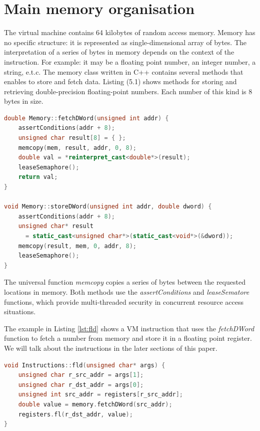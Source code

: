 \documentclass[oneside]{book}
\begin{document}
\section{Main memory organisation}

The virtual machine contains 64 kilobytes of random access memory. Memory has no specific structure: it is represented as single-dimensional array of bytes. The interpretation of a series of bytes in memory depends on the context of the instruction. For example: it may be a floating point number, an integer number, a string, e.t.c. 
The memory class written in C++ contains several methods that enables to store and fetch data. Listing (5.1) shows methods for storing and retrieving double-precision floating-point numbers. Each number of this kind is 8 bytes in size.

\begin{lstlisting}[caption=Fetch and store dword into memory, label={lst:mem-fetch}, language=C++, style=customc]
double Memory::fetchDWord(unsigned int addr) {
	assertConditions(addr + 8);
	unsigned char result[8] = { };
	memcopy(mem, result, addr, 0, 8);
	double val = *reinterpret_cast<double*>(result);
	leaseSemaphore();
	return val;
}

void Memory::storeDWord(unsigned int addr, double dword) {
	assertConditions(addr + 8);
	unsigned char* result 
	  = static_cast<unsigned char*>(static_cast<void*>(&dword));
	memcopy(result, mem, 0, addr, 8);
	leaseSemaphore();
}
\end{lstlisting}

\noindent 
The universal function \emph{memcopy} copies a series of bytes between the requested locations in memory. Both methods use the \emph{assertConditions} and \emph{leaseSematore} functions, which provide multi-threaded security in concurrent resource access situations.

The example in Listing \ref{lst:fld} shows a VM instruction that uses the \emph{fetchDWord} function to fetch a number from memory and store it in a floating point register. We will talk about the instructions in the later sections of this paper.

\begin{lstlisting}[caption=Method that load from the memory into the register, label={lst:fld}, language=C++, style=customc]
void Instructions::fld(unsigned char* args) {
	unsigned char r_src_addr = args[1];
	unsigned char r_dst_addr = args[0];
	unsigned int src_addr = registers[r_src_addr];
	double value = memory.fetchDWord(src_addr);
	registers.fl(r_dst_addr, value);
}
\end{lstlisting}
\end{document}
